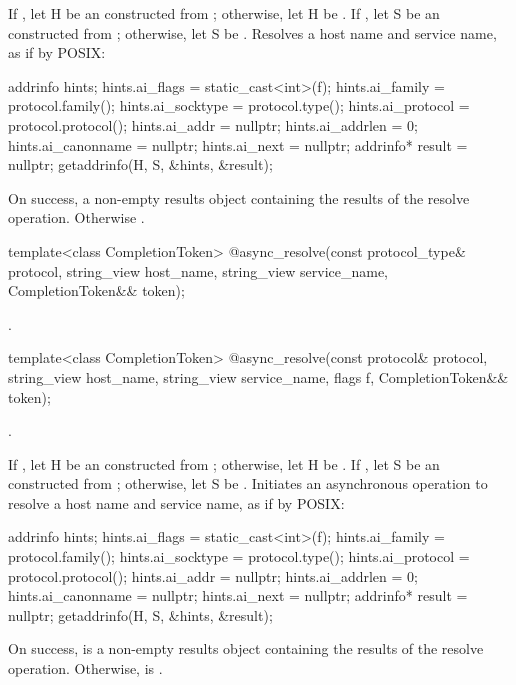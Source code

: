 \begin{itemdescr}
\pnum
\effects If , let H be an \ntbs constructed from ; otherwise, let H be . If , let S be an \ntbs constructed from ; otherwise, let S be . Resolves a host name and service name, as if by POSIX:
\begin{codeblock}
addrinfo hints;
hints.ai_flags = static_cast<int>(f);
hints.ai_family = protocol.family();
hints.ai_socktype = protocol.type();
hints.ai_protocol = protocol.protocol();
hints.ai_addr = nullptr;
hints.ai_addrlen = 0;
hints.ai_canonname = nullptr;
hints.ai_next = nullptr;
addrinfo* result = nullptr;
getaddrinfo(H, S, &hints, &result);
\end{codeblock}


\pnum
\returns On success, a non-empty results object containing the results of the resolve operation. Otherwise .
\end{itemdescr}

\begin{itemdecl}
template<class CompletionToken>
  @\DEDUCED@ async_resolve(const protocol_type& protocol,
                        string_view host_name, string_view service_name,
                        CompletionToken&& token);
\end{itemdecl}

\begin{itemdescr}
\pnum
\returns {}.
\end{itemdescr}

\begin{itemdecl}
template<class CompletionToken>
  @\DEDUCED@ async_resolve(const protocol& protocol,
                        string_view host_name, string_view service_name,
                        flags f, CompletionToken&& token);
\end{itemdecl}

\begin{itemdescr}
\pnum
\completionsig {}.

\pnum
\effects If , let H be an \ntbs constructed from ; otherwise, let H be . If , let S be an \ntbs constructed from ; otherwise, let S be . Initiates an asynchronous operation to resolve a host name and service name, as if by POSIX:
\begin{codeblock}
addrinfo hints;
hints.ai_flags = static_cast<int>(f);
hints.ai_family = protocol.family();
hints.ai_socktype = protocol.type();
hints.ai_protocol = protocol.protocol();
hints.ai_addr = nullptr;
hints.ai_addrlen = 0;
hints.ai_canonname = nullptr;
hints.ai_next = nullptr;
addrinfo* result = nullptr;
getaddrinfo(H, S, &hints, &result);
\end{codeblock}
 On success,  is a non-empty results object containing the results of the resolve operation. Otherwise,  is .
\end{itemdescr}

